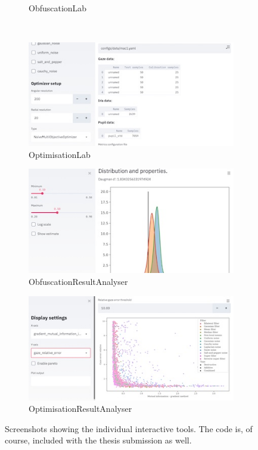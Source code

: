 \begin{figure}
\begin{subfigure}{0.3\textwidth}
		\caption{ObfuscationLab}\label{fig:tools:obfuscationlab}
	\end{subfigure}
	\\
	\begin{subfigure}{0.3\textwidth}\centering
		\includegraphics[width=1\linewidth]{figures/labs/OptimisationLab}
		\caption{OptimisationLab}\label{fig:tools:optimisationlab}
	\end{subfigure}
	\hfill
	\begin{subfigure}{0.3\textwidth}\centering
		\includegraphics[width=1\linewidth]{figures/labs/ObfuscationResultAnalyser}
		\caption{ObfuscationResultAnalyser}\label{fig:tools:obfuscationresultanalyser}
	\end{subfigure}
	\hfill
	\begin{subfigure}{0.3\textwidth}\centering
		\includegraphics[width=1\linewidth]{figures/labs/OptimisationResultAnalyser}
		\caption{OptimisationResultAnalyser}\label{fig:tools:optimisationresultanalyser}
	\end{subfigure}
	
	\caption{Screenshots showing the individual interactive tools. The code is, of course, included with the thesis submission as well.}\label{fig:tools}
\end{figure}

